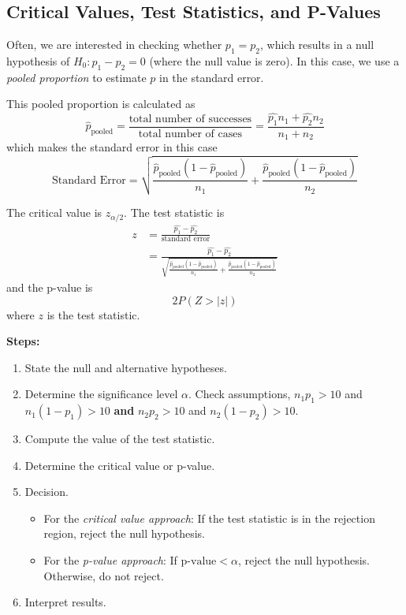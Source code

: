 \documentclass[
]{book}
\providecommand{\tightlist}{%
  \setlength{\itemsep}{0pt}\setlength{\parskip}{0pt}}
\begin{document}
\subsection{Critical Values, Test Statistics, and P-Values}\label{critical-values-test-statistics-and-p-values}

Often, we are interested in checking whether \(p_1 = p_2\), which results in a null hypothesis of \(H_0: p_1 - p_2 = 0\) (where the null value is zero). In this case, we use a \emph{pooled proportion} to estimate \(p\) in the standard error.

This pooled proportion is calculated as \[\hat{p}_{\text{pooled}} = \frac{\text{total number of successes}}{\text{total number of cases}} = \frac{\hat{p_1}n_1 + \hat{p_2}n_2}{n_1 + n_2}\]
which makes the standard error in this case
\[ \text{Standard Error} = \sqrt{\frac{\hat{p}_{\text{pooled}}(1-\hat{p}_{\text{pooled}})}{n_1} + \frac{\hat{p}_{\text{pooled}}(1-\hat{p}_{\text{pooled}})}{n_2}}\]

The critical value is \(z_{\alpha/2}\). The test statistic is
\[\begin{aligned}
z &= \frac{\hat{p_1}-\hat{p_2}}{\text{standard error}} \\
&=  \frac{\hat{p_1}-\hat{p_2}}{\sqrt{\frac{\hat{p}_{\text{pooled}}(1-\hat{p}_{\text{pooled}})}{n_1} + \frac{\hat{p}_{\text{pooled}}(1-\hat{p}_{\text{pooled}})}{n_2}}}
\end{aligned}\]
and the p-value is \[2P(Z > |z|)\] where \(z\) is the test statistic.

\textbf{Steps:}

\begin{enumerate}
\def\labelenumi{\arabic{enumi}.}
\tightlist
\item
  State the null and alternative hypotheses.
\item
  Determine the significance level \(\alpha\). Check assumptions, \(n_1p_1 > 10\) and \(n_1(1-p_1)>10\) \textbf{and} \(n_2p_2 > 10\) and \(n_2(1-p_2)>10\).
\item
  Compute the value of the test statistic.
\item
  Determine the critical value or p-value.
\item
  Decision.

  \begin{itemize}
  \tightlist
  \item
    For the \emph{critical value approach}: If the test statistic is in the rejection region, reject the null hypothesis.
  \item
    For the \emph{p-value approach}: If \(\text{p-value} < \alpha\), reject the null hypothesis. Otherwise, do not reject.
  \end{itemize}
\item
  Interpret results.
\end{enumerate}
\end{document}
